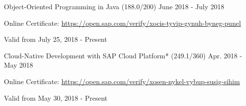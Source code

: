 \begin{cventries}
  \cventry
    {Object-Oriented Programming in Java (188.0/200)} %
    {} %
    {} %
    {June 2018 - July 2018} %
    {
	    \begin{cvitems} %
        \item[] {Online Certificate: \url{https://open.sap.com/verify/xocis-tyvip-gynuh-byneg-punel}} %
        \item[] {Valid from July 25, 2018 - Present} %
      \end{cvitems}
    }   
    \vspace{-0.1cm}
  \cventry
    {Cloud-Native Development with SAP Cloud Platform* (249.1/360)} %
    {} %
    {} %
    {Apr. 2018 - May 2018} %
    {
	    \begin{cvitems} %
        \item[] {Online Certificate: \url{https://open.sap.com/verify/xosen-nykel-vybup-susig-sihim}} %
        \item[] {Valid from May 30, 2018 - Present} %
      \end{cvitems}
    }   
    \vspace{-0.1cm}

\end{cventries}
